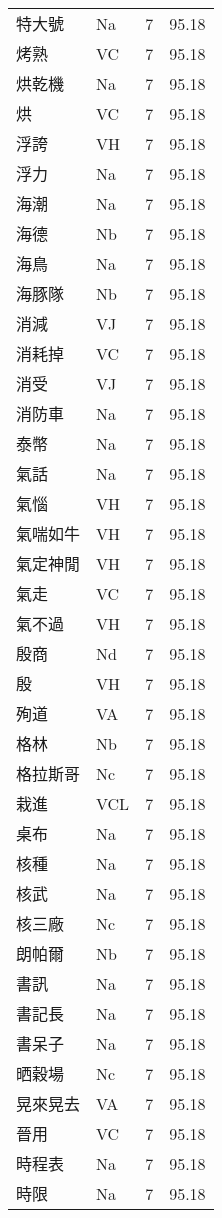\documentclass[twocolumn]{book}
\begin{document}
\begin{supertabular}{llrr}
特大號 & Na & 7 &  95.18\\
烤熟 & VC & 7 &  95.18\\
烘乾機 & Na & 7 &  95.18\\
烘 & VC & 7 &  95.18\\
浮誇 & VH & 7 &  95.18\\
浮力 & Na & 7 &  95.18\\
海潮 & Na & 7 &  95.18\\
海德 & Nb & 7 &  95.18\\
海鳥 & Na & 7 &  95.18\\
海豚隊 & Nb & 7 &  95.18\\
消減 & VJ & 7 &  95.18\\
消耗掉 & VC & 7 &  95.18\\
消受 & VJ & 7 &  95.18\\
消防車 & Na & 7 &  95.18\\
泰幣 & Na & 7 &  95.18\\
氣話 & Na & 7 &  95.18\\
氣惱 & VH & 7 &  95.18\\
氣喘如牛 & VH & 7 &  95.18\\
氣定神閒 & VH & 7 &  95.18\\
氣走 & VC & 7 &  95.18\\
氣不過 & VH & 7 &  95.18\\
殷商 & Nd & 7 &  95.18\\
殷 & VH & 7 &  95.18\\
殉道 & VA & 7 &  95.18\\
格林 & Nb & 7 &  95.18\\
格拉斯哥 & Nc & 7 &  95.18\\
栽進 & VCL & 7 &  95.18\\
桌布 & Na & 7 &  95.18\\
核種 & Na & 7 &  95.18\\
核武 & Na & 7 &  95.18\\
核三廠 & Nc & 7 &  95.18\\
朗帕爾 & Nb & 7 &  95.18\\
書訊 & Na & 7 &  95.18\\
書記長 & Na & 7 &  95.18\\
書呆子 & Na & 7 &  95.18\\
晒穀場 & Nc & 7 &  95.18\\
晃來晃去 & VA & 7 &  95.18\\
晉用 & VC & 7 &  95.18\\
時程表 & Na & 7 &  95.18\\
時限 & Na & 7 &  95.18\\

\end{supertabular}
\end{document}

